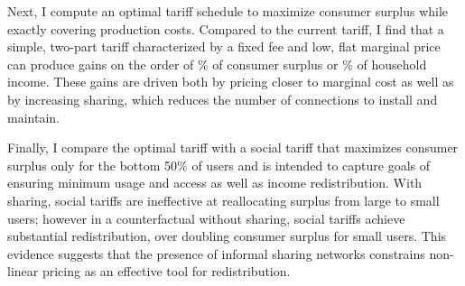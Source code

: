 \documentclass[12pt]{article}
\begin{document}
Next, I compute an optimal tariff schedule to maximize consumer surplus while exactly covering production costs.  Compared to the current tariff, I find that a simple, two-part tariff characterized by a fixed fee and low, flat marginal price can produce gains on the order of \unskip\% of consumer surplus or \unskip\% of household income.  These gains are driven both by pricing closer to marginal cost as well as by increasing sharing, which reduces the number of connections to install and maintain.  

Finally, I compare the optimal tariff with a social tariff that maximizes consumer surplus only for the bottom 50\% of users and is intended to capture goals of ensuring minimum usage and access as well as income redistribution.  With sharing, social tariffs are ineffective at reallocating surplus from large to small users; however in a counterfactual without sharing, social tariffs achieve substantial redistribution, over doubling consumer surplus for small users.  This evidence suggests that the presence of informal sharing networks constrains non-linear pricing as an effective tool for redistribution.




\end{document}
